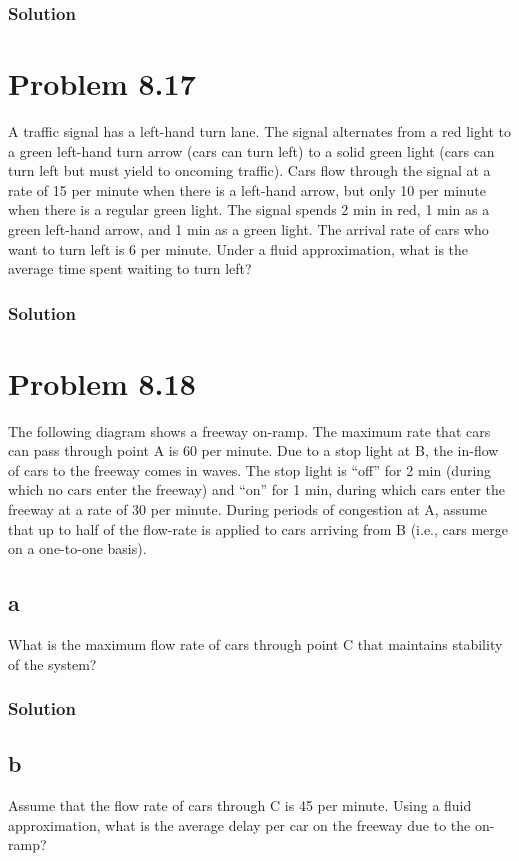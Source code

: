\documentclass[letterpaper]{amsart}
\begin{document}
\subsubsection*{Solution}

\section{Problem 8.17} %
A traffic signal has a left-hand turn lane. The signal alternates from a red
light to a green left-hand turn arrow (cars can turn left) to a solid green light
(cars can turn left but must yield to oncoming traffic). Cars flow through
the signal at a rate of 15 per minute when there is a left-hand arrow, but
only 10 per minute when there is a regular green light. The signal spends
2 min in red, 1 min as a green left-hand arrow, and 1 min as a green light.
The arrival rate of cars who want to turn left is 6 per minute. Under a fluid
approximation, what is the average time spent waiting to turn left?
\subsubsection*{Solution}

\section{Problem 8.18} %
The following diagram shows a freeway on-ramp. The maximum rate that
cars can pass through point A is 60 per minute. Due to a stop light at B, the
in-flow of cars to the freeway comes in waves. The stop light is “off” for
2 min (during which no cars enter the freeway) and “on” for 1 min, during
which cars enter the freeway at a rate of 30 per minute. During periods of
congestion at A, assume that up to half of the flow-rate is applied to cars
arriving from B (i.e., cars merge on a one-to-one basis).
\subsection*{a}
What is the maximum flow rate of cars through point C that maintains
stability of the system?
\subsubsection*{Solution}
\subsection*{b}
Assume that the flow rate of cars through C is 45 per minute. Using a
fluid approximation, what is the average delay per car on the freeway
due to the on-ramp?
\end{document}
